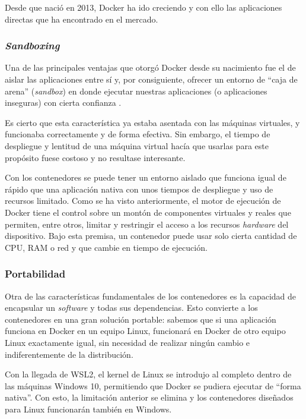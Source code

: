 Desde que nació en 2013, Docker ha ido creciendo y con ello las aplicaciones
directas que ha encontrado en el mercado.

\subsubsection*{\textit{Sandboxing}}
Una de las principales ventajas que otorgó Docker desde su nacimiento fue el de
aislar las aplicaciones entre sí y, por consiguiente, ofrecer un entorno de
``caja de arena'' (\textit{sandbox}) en donde ejecutar nuestras aplicaciones
(o aplicaciones inseguras) con cierta confianza \cite{yegulalpWhatDockerSpark2019}.

Es cierto que esta característica ya estaba asentada con las máquinas virtuales,
y funcionaba correctamente y de forma efectiva. Sin embargo, el tiempo de despliegue
y lentitud de una máquina virtual hacía que usarlas para este propósito fuese
costoso y no resultase interesante.

Con los contenedores se puede tener un entorno aislado que funciona igual de rápido
que una aplicación nativa con unos tiempos de despliegue y uso de recursos limitado.
Como se ha visto anteriormente, el motor de ejecución de Docker tiene el control sobre
un montón de componentes virtuales y reales que permiten, entre otros, limitar y
restringir el acceso a los recursos \textit{hardware} del dispositivo. Bajo esta
premisa, un contenedor puede usar solo cierta cantidad de CPU, RAM o red y que
cambie en tiempo de ejecución.

\subsubsection*{Portabilidad}
Otra de las características fundamentales de los contenedores es la
capacidad de encapsular un \textit{software} y todas
sus dependencias. Esto convierte a los contenedores en una gran solución portable:
sabemos que si una aplicación funciona en Docker en un equipo Linux, funcionará en
Docker de otro equipo Linux exactamente igual, sin necesidad de realizar ningún
cambio e indiferentemente de la distribución.

Con la llegada de WSL2, el kernel de Linux se introdujo al completo dentro de las
máquinas Windows 10, permitiendo que Docker se pudiera ejecutar de ``forma nativa''\cite{DockerDesktopWSL2021}. Con esto, la limitación anterior
se elimina y los contenedores diseñados para Linux funcionarán también en Windows.

